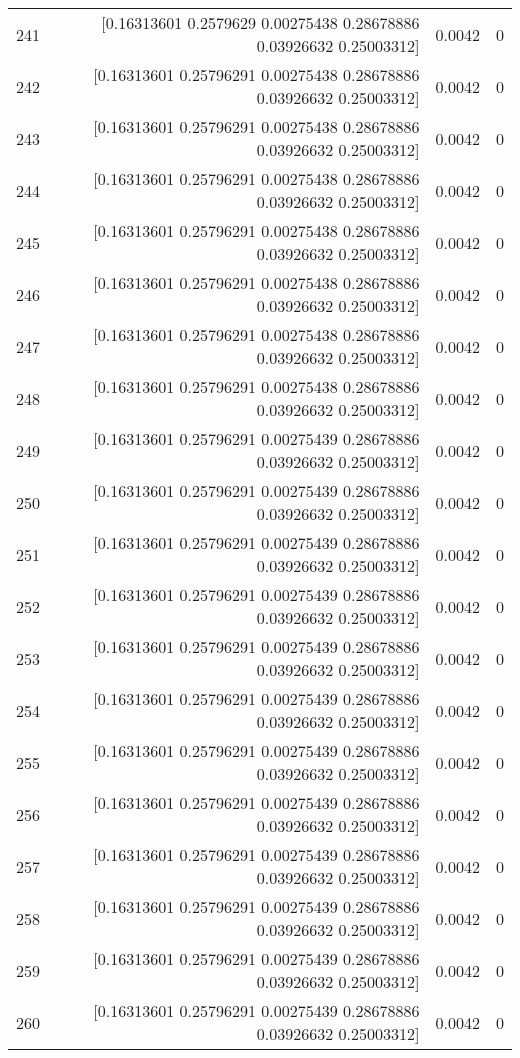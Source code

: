 \begin{longtable}{lrrr}
241 & [0.16313601 0.2579629  0.00275438 0.28678886 0.03926632 0.25003312] & 0.0042 & 0 \\
242 & [0.16313601 0.25796291 0.00275438 0.28678886 0.03926632 0.25003312] & 0.0042 & 0 \\
243 & [0.16313601 0.25796291 0.00275438 0.28678886 0.03926632 0.25003312] & 0.0042 & 0 \\
244 & [0.16313601 0.25796291 0.00275438 0.28678886 0.03926632 0.25003312] & 0.0042 & 0 \\
245 & [0.16313601 0.25796291 0.00275438 0.28678886 0.03926632 0.25003312] & 0.0042 & 0 \\
246 & [0.16313601 0.25796291 0.00275438 0.28678886 0.03926632 0.25003312] & 0.0042 & 0 \\
247 & [0.16313601 0.25796291 0.00275438 0.28678886 0.03926632 0.25003312] & 0.0042 & 0 \\
248 & [0.16313601 0.25796291 0.00275438 0.28678886 0.03926632 0.25003312] & 0.0042 & 0 \\
249 & [0.16313601 0.25796291 0.00275439 0.28678886 0.03926632 0.25003312] & 0.0042 & 0 \\
250 & [0.16313601 0.25796291 0.00275439 0.28678886 0.03926632 0.25003312] & 0.0042 & 0 \\
251 & [0.16313601 0.25796291 0.00275439 0.28678886 0.03926632 0.25003312] & 0.0042 & 0 \\
252 & [0.16313601 0.25796291 0.00275439 0.28678886 0.03926632 0.25003312] & 0.0042 & 0 \\
253 & [0.16313601 0.25796291 0.00275439 0.28678886 0.03926632 0.25003312] & 0.0042 & 0 \\
254 & [0.16313601 0.25796291 0.00275439 0.28678886 0.03926632 0.25003312] & 0.0042 & 0 \\
255 & [0.16313601 0.25796291 0.00275439 0.28678886 0.03926632 0.25003312] & 0.0042 & 0 \\
256 & [0.16313601 0.25796291 0.00275439 0.28678886 0.03926632 0.25003312] & 0.0042 & 0 \\
257 & [0.16313601 0.25796291 0.00275439 0.28678886 0.03926632 0.25003312] & 0.0042 & 0 \\
258 & [0.16313601 0.25796291 0.00275439 0.28678886 0.03926632 0.25003312] & 0.0042 & 0 \\
259 & [0.16313601 0.25796291 0.00275439 0.28678886 0.03926632 0.25003312] & 0.0042 & 0 \\
260 & [0.16313601 0.25796291 0.00275439 0.28678886 0.03926632 0.25003312] & 0.0042 & 0 \\

\end{longtable}
